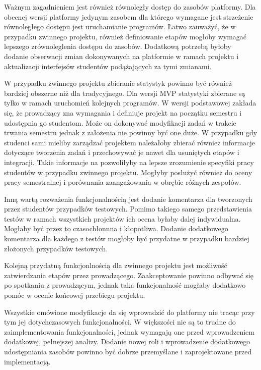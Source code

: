 Ważnym zagadnieniem jest również równoległy dostęp do zasobów platformy.
Dla obecnej wersji platformy jedynym zasobem dla którego wymagane jest strzeżenie równoległego dostępu jest uruchamianie programów.
Łatwo zauważyć, że w przypadku zwinnego projektu, również definiowanie etapów mogłoby wymagać lepszego zrównoleglenia dostępu do zasobów.
Dodatkową potrzebą byłoby dodanie obserwacji zmian dokonywanych na platformie w ramach projektu i aktualizacji interfejsów studentów podążających za tymi zmianami.

W przypadku zwinnego projektu zbieranie statystyk powinno być również bardziej obszerne niż dla tradycyjnego.
Dla wersji MVP statystyki zbierane są tylko w ramach uruchomień kolejnych programów.
W wersji podstawowej zakłada się, że prowadzący zna wymagania i definiuje projekt na początku semestru i udostępnia go studentom.
Może on dokonywać modyfikacji zadań w trakcie trwania semestru jednak z założenia nie powinny być one duże.
W przypadku gdy studenci sami mieliby zarządzać projektem należałoby zbierać również informacje dotyczące tworzenia zadań i przechowywać je nawet dla usuniętych etapów i integracji.
Takie informacje na pozwoliłyby na lepsze zrozumienie specyfiki pracy studentów w przypadku zwinnego projektu.
Mogłyby posłużyć również do oceny pracy semestralnej i porównania zaangażowania w obrębie różnych zespołów.

Inną wartą rozważenia funkcjonalnością jest dodanie komentarza dla tworzonych przez studentów przypadków testowych.
Pomimo takiego samego przedstawienia testów w ramach wszystkich projektów ich ocena byłaby dalej indywidualna.
Mogłaby być przez to czasochłonnna i kłopotliwa.
Dodanie dodatkowego komentarza dla każdego z testów mogłoby być przydatne w przypadku bardziej złożonych przypadków testowych.

Kolejną przydatną funkcjonlnością dla zwinnego projektu jest możliwość zatwierdzania etapów przez prowadzącego.
Zaakceptowanie powinno odbywać się po spotkaniu z prowadzącym, jednak taka funkcjonalność mogłaby dodatkowo pomóc w ocenie końcowej przebiegu projektu.

Wszystkie omówione modyfikacje da się wprowadzić do platformy nie tracąc przy tym jej dotychczasowych funkcjonalności.
W większości nie są to trudne do zaimplementowania funkcjonalności, jednak wymagają one przed wprowadzeniem dodatkowej, pełnejszej analizy.
Dodanie nowej roli i wprowadzenie dodatkowego udostępniania zasobów powinno być dobrze przemyślane i zaprojektowane przed implementacją.

